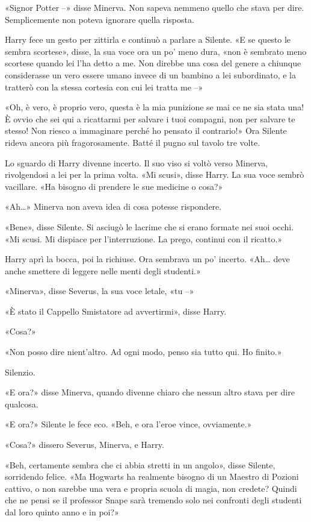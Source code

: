 «Signor Potter –» disse Minerva. Non sapeva nemmeno quello che stava per dire. Semplicemente non poteva ignorare quella risposta.

Harry fece un gesto per zittirla e continuò a parlare a Silente. «E se questo le sembra scortese», disse, la sua voce ora un po’ meno dura, «non è sembrato meno scortese quando lei l’ha detto a me. Non direbbe una cosa del genere a chiunque considerasse un vero essere umano invece di un bambino a lei subordinato, e la tratterò con la stessa cortesia con cui lei tratta me –»

«Oh, è vero, è proprio vero, questa è la mia punizione se mai ce ne sia stata una! È ovvio che sei qui a ricattarmi per salvare i tuoi compagni, non per salvare te stesso! Non riesco a immaginare perché ho pensato il contrario!» Ora Silente rideva ancora più fragorosamente. Batté il pugno sul tavolo tre volte.

Lo sguardo di Harry divenne incerto. Il suo viso si voltò verso Minerva, rivolgendosi a lei per la prima volta. «Mi scusi», disse Harry. La sua voce sembrò vacillare. «Ha bisogno di prendere le sue medicine o cosa?»

«Ah…» Minerva non aveva idea di cosa potesse rispondere.

«Bene», disse Silente. Si asciugò le lacrime che si erano formate nei suoi occhi. «Mi scusi. Mi dispiace per l’interruzione. La prego, continui con il ricatto.»

Harry aprì la bocca, poi la richiuse. Ora sembrava un po’ incerto. «Ah… deve anche smettere di leggere nelle menti degli studenti.»

«Minerva», disse Severus, la sua voce letale, «tu –»

«È stato il Cappello Smistatore ad avvertirmi», disse Harry.

«Cosa?»

«Non posso dire nient’altro. Ad ogni modo, penso sia tutto qui. Ho finito.»

Silenzio.

«E ora?» disse Minerva, quando divenne chiaro che nessun altro stava per dire qualcosa.

«E ora?» Silente le fece eco. «Beh, e ora l’eroe vince, ovviamente.»

«Cosa?» dissero Severus, Minerva, e Harry.

«Beh, certamente sembra che ci abbia stretti in un angolo», disse Silente, sorridendo felice. «Ma Hogwarts ha realmente bisogno di un Maestro di Pozioni cattivo, o non sarebbe una vera e propria scuola di magia, non credete? Quindi che ne pensi se il professor Snape sarà tremendo solo nei confronti degli studenti dal loro quinto anno e in poi?»

